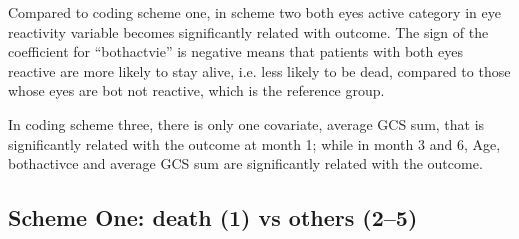 \documentclass{article}
\begin{document}
Compared to coding scheme one, in scheme two both eyes active category in eye reactivity variable becomes significantly related with outcome. The sign of the coefficient for ``bothactvie'' is negative means that patients with both eyes reactive are more likely to stay alive, i.e. less likely to be dead, compared to those whose eyes are bot not reactive, which is the reference group.

In coding scheme three, there is only one covariate, average GCS sum, that is significantly related with the outcome at month 1; while in month 3 and 6, Age, bothactivce and average GCS sum are significantly related with the outcome.


\subsection{Scheme One: death (1) vs others (2--5)}
\end{document}
